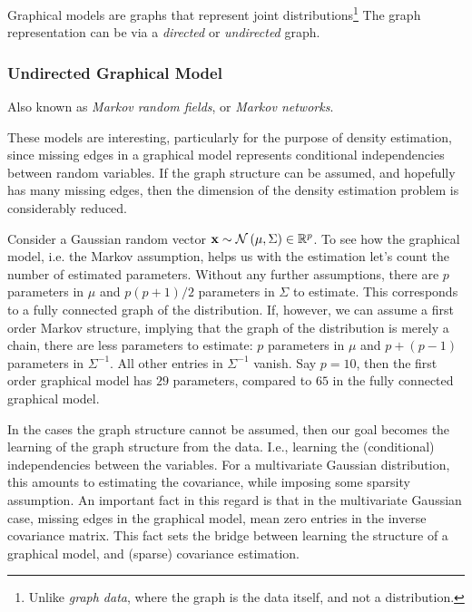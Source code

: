 Graphical models are graphs that represent joint distributions\footnote{Unlike \emph{graph data}, where the graph is the data itself, and not a distribution.}
The graph representation can be via a \emph{directed} or \emph{undirected} graph.

\subsubsection{Undirected Graphical Model}
Also known as \emph{Markov random fields}, or \emph{Markov networks}.

These models are interesting, particularly for the purpose of density estimation, since missing edges in a graphical model represents conditional independencies between random variables. 
If the graph structure can be assumed, and hopefully has many missing edges, then the dimension of the density estimation problem is considerably reduced. 

\begin{example}
Consider a Gaussian random vector $\mathbf{x} \sim \mathcal{N}\left(\mu, \Sigma\right)\in \mathbb{R}^p$.
To see how the graphical model, i.e. the Markov assumption, helps us with the estimation let's count the number of estimated parameters.
Without any further assumptions, there are $p$ parameters in $\mu$ and $p(p+1)/2$ parameters in $\Sigma$ to estimate.
This corresponds to a fully connected graph of the distribution.
If, however, we can assume a first order Markov structure, implying that the graph of the distribution is merely a chain, there are less parameters to estimate: $p$ parameters in $\mu$ and $p+(p-1)$ parameters in $\Sigma^{-1}$. All other entries in $\Sigma^{-1}$ vanish.
Say $p=10$, then the first order graphical model has $29$ parameters, compared to $65$ in the fully connected graphical model.
\end{example}


In the cases the graph structure cannot be assumed, then our goal becomes the learning of the graph structure from the data. I.e., learning the (conditional) independencies between the variables. For a multivariate Gaussian distribution, this amounts to estimating the covariance, while imposing some sparsity assumption. 
An important fact in this regard is that in the multivariate Gaussian case, missing edges in the graphical model, mean zero entries in the inverse covariance matrix. This fact sets the bridge between learning the structure of a graphical model, and (sparse) covariance estimation.


